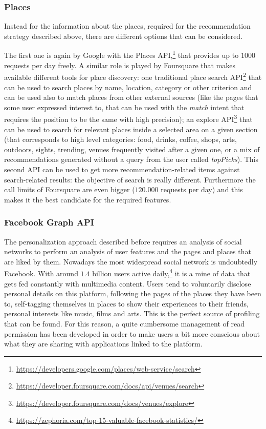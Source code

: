 \subsubsection{Places}
Instead for the information about the places, required for the recommendation strategy described above, there are different options that can be considered.

The first one is again by Google with the Places API,\footnote{\url{https://developers.google.com/places/web-service/search}} that provides up to $1000$ requests per day freely. A similar role is played by Foursquare that makes available different tools for place discovery: one traditional place search API\footnote{\url{https://developer.foursquare.com/docs/api/venues/search}} that can be used to search places by name, location, category or other criterion and can be used also to match places from other external sources (like the pages that some user expressed interest to, that can be used with the \textit{match} intent that requires the position to be the same with high precision); an explore API\footnote{\url{https://developer.foursquare.com/docs/venues/explore}} that can be used to search for relevant places inside a selected area on a given section (that corresponds to high level categories: food, drinks, coffee, shops, arts, outdoors, sights, trending, venues frequently visited after a given one, or a mix of recommendations generated without a query from the user called \textit{topPicks}). This second API can be used to get more recommendation-related items against search-related results: the objective of search is really different. Furthermore the call limits of Foursquare are even bigger ($120.000$ requests per day) and this makes it the best candidate for the required features.

\subsubsection{Facebook Graph API}
The personalization approach described before requires an analysis of social networks to perform an analysis of user features and the pages and places that are liked by them. Nowadays the most widespread social network is undoubtedly Facebook. With around $1.4$ billion users active daily,\footnote{\url{https://zephoria.com/top-15-valuable-facebook-statistics/}} it is a mine of data that gets fed constantly with multimedia content. Users tend to voluntarily disclose personal details on this platform, following the pages of the places they have been to, self-tagging themselves in places to show their experiences to their friends, personal interests like music, films and arts. This is the perfect source of profiling that can be found. For this reason, a quite cumbersome management of read permission has been developed in order to make users a bit more conscious about what they are sharing with applications linked to the platform.

